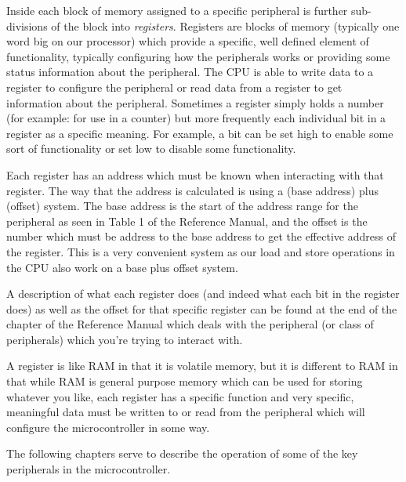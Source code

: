 Inside each block of memory assigned to a specific peripheral is further sub-divisions of the block into \emph{registers}. Registers are blocks of memory (typically one word big on our processor) which provide a specific, well defined element of functionality, typically configuring how the peripherals works or providing some status information about the peripheral. The CPU is able to write data to a register to configure the peripheral or read data from a register to get information about the peripheral. Sometimes a register simply holds a number (for example: for use in a counter) but more frequently each individual bit in a register as a specific meaning. For example, a bit can be set high to enable some sort of functionality or set low to disable some functionality. 

Each register has an address which must be known when interacting with that register. The way that the address is calculated is using a (base address) plus (offset) system. The base address is the start of the address range for the peripheral as seen in Table 1 of the Reference Manual, and the offset is the number which must be address to the base address to get the effective address of the register. This is a very convenient system as our load and store operations in the CPU also work on a base plus offset system. 

A description of what each register does (and indeed what each bit in the register does) as well as the offset for that specific register can be found at the end of the chapter of the Reference Manual which deals with the peripheral (or class of peripherals) which you're trying to interact with. 

A register is like RAM in that it is volatile memory, but it is different to RAM in that while RAM is general purpose memory which can be used for storing whatever you like, each register has a specific function and very specific, meaningful data must be written to or read from the peripheral which will configure the microcontroller in some way.

The following chapters serve to describe the operation of some of the key peripherals in the microcontroller.

